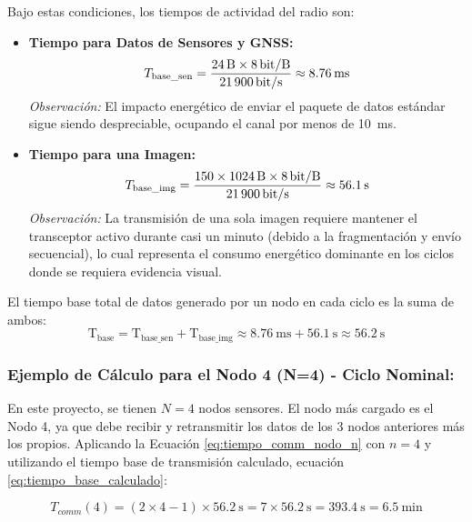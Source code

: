 Bajo estas condiciones, los tiempos de actividad del radio son:

\begin{itemize}
    \item \textbf{Tiempo para Datos de Sensores y GNSS:}
    \[
    T_{\text{base\_sen}} = \frac{\SI{24}{\byte}\times \SI[per-mode = symbol]{8}{\bit\per\byte}}{\SI[per-mode = symbol]{21900}{\bit\per\second}} \approx \textbf{\SI{8.76}{\milli\second}}
    \]
    \textit{Observación:} El impacto energético de enviar el paquete de datos estándar sigue siendo despreciable, ocupando el canal por menos de \SI{10}{\milli\second}.

    \item \textbf{Tiempo para una Imagen:}
    \[
    T_{\text{base\_img}} = \frac{ 150 \times \SI[per-mode = symbol]{1024}{\byte} \times \SI[per-mode = symbol]{8}{\bit\per\byte}}{\SI[per-mode = symbol]{21900}{\bit\per\second}} \approx \textbf{\SI{56.1}{\second}}
    \]
    \textit{Observación:} La transmisión de una sola imagen requiere mantener el transceptor activo durante casi un minuto (debido a la fragmentación y envío secuencial), lo cual representa el consumo energético dominante en los ciclos donde se requiera evidencia visual.
\end{itemize}

El tiempo base total de datos generado por un nodo en cada ciclo es la suma de ambos:
\begin{equation} \label{eq:tiempo_base_calculado}
\text{T}_{\text{base}} = \text{T}_{\text{base\_sen}} + \text{T}_{\text{base\_img}} \approx \SI{8.76}{\milli\second} + \SI{56.1}{\second} \approx \boxed{\SI{56.2}{\second}}
\end{equation}

\subsubsection*{Ejemplo de Cálculo para el Nodo 4 (N=4) - Ciclo Nominal:}
En este proyecto, se tienen $N=4$ nodos sensores. El nodo más cargado es el Nodo 4, ya que debe recibir y retransmitir los datos de los 3 nodos anteriores más los propios. Aplicando la Ecuación \eqref{eq:tiempo_comm_nodo_n} con $n=4$ y utilizando el tiempo base de transmisión calculado, ecuación \eqref{eq:tiempo_base_calculado}:

\begin{equation}\label{eq:tiempo_comm_nodo4}
    T_{comm}(4) = (2 \times 4 - 1) \times \SI{56.2}{\second} = 7 \times \SI{56.2}{\second} = \SI{393.4}{\second} = \boxed{\SI{6.5}{\minute}}
\end{equation}


